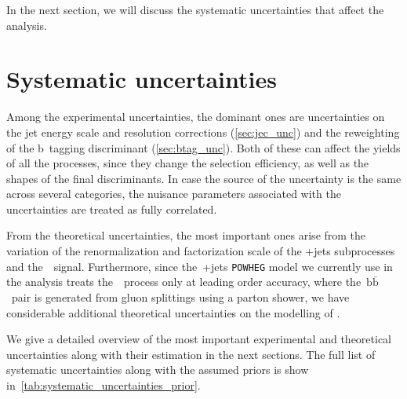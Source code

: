 In the next section, we will discuss the systematic uncertainties that affect the analysis.

\section{Systematic uncertainties}
\label{sec:systematic_unc}
Among the experimental uncertainties, the dominant ones are uncertainties on the jet energy scale and resolution corrections (\cref{sec:jec_unc}) and the reweighting of the b~tagging discriminant (\cref{sec:btag_unc}). Both of these can affect the yields of all the processes, since they change the selection efficiency, as well as the shapes of the final discriminants. In case the source of the uncertainty is the same across several categories, the nuisance parameters associated with the uncertainties are treated as fully correlated.

From the theoretical uncertainties, the most important ones arise from the variation of the renormalization and factorization scale of the \ttbar+jets subprocesses and the~\ttH~signal. Furthermore, since the~\ttbar+jets \texttt{POWHEG} model we currently use in the analysis treats the~\ttbb~process only at leading order accuracy, where the~$\mathrm{b}\bar{\mathrm{b}}$~pair is generated from gluon splittings using a parton shower, we have considerable additional theoretical uncertainties on the modelling of \ttbb.

We give a detailed overview of the most important experimental and theoretical uncertainties along with their estimation in the next sections. The full list of systematic uncertainties along with the assumed priors is show in~\cref{tab:systematic_uncertainties_prior}.

